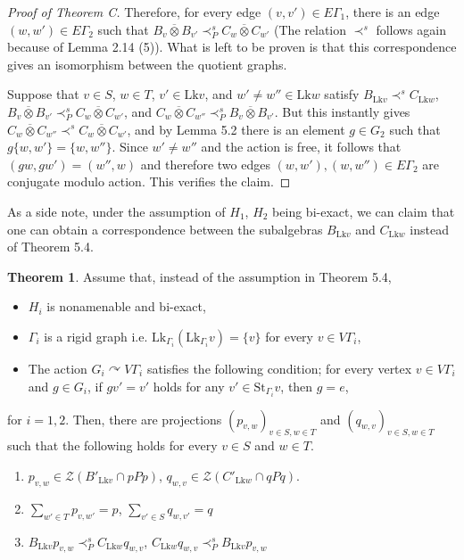\documentclass{amsart}
\theoremstyle{definition}
\newtheorem{theorem}{Theorem}[section]
\newcommand{\action}{\curvearrowright}
\begin{document}
\begin{proof}[Proof of Theorem C]
Therefore, for every edge $(v,v')\in E\Gamma_1$, 
there is an edge $(w,w')\in E\Gamma_2$ such that
$B_v\overline{\otimes} B_{v'} \prec^s_P C_w\overline{\otimes} C_{w'}$
(The relation $\prec^s$ follows again because of Lemma 2.14 (5)). 
What is left to be proven is that this correspondence gives an isomorphism between
the quotient graphs. 

Suppose that $v\in S$, $w\in T$, $v'\in \mathrm{Lk}v$, and $w'\neq w''\in \mathrm{Lk}w$
satisfy 
$B_{\mathrm{Lk}v}\prec^s C_{\mathrm{Lk}w}$, 
$B_v\overline{\otimes} B_{v'} \prec^s_P C_w\overline{\otimes} C_{w'}$, and
$C_w\overline{\otimes} C_{w''} \prec^s_P B_v\overline{\otimes} B_{v'}$. 
But this instantly gives 
$C_w\overline{\otimes} C_{w''}\prec^s C_w\overline{\otimes} C_{w'}$, 
and by Lemma 5.2 there is an element $g\in G_2$ such that 
$g\{ w, w' \} = \{w, w''\}$. 
Since $w'\neq w''$ and the action is free, 
it follows that $(gw,gw')=(w'', w)$ and therefore two edges $(w,w'), (w,w'')\in E\Gamma_2$ are conjugate modulo action. This verifies the claim. 
\end{proof}

As a side note, under the assumption of $H_1$, $H_2$ being bi-exact, 
we can claim that one can obtain a correspondence 
between the subalgebras $B_{\mathrm{Lk}v}$ and $C_{\mathrm{Lk}w}$
instead of Theorem 5.4. 


\begin{theorem}
Assume that, instead of the assumption in Theorem 5.4, 
\begin{itemize}
\item $H_i$ is nonamenable and bi-exact, 
\item $\Gamma_i$ is a rigid graph i.e. $\mathrm{Lk}_{\Gamma_i}(\mathrm{Lk}_{\Gamma_i}v)=\{ v \}$ for every $v\in V\Gamma_i$, 
\item The action $G_i\action V\Gamma_i$ satisfies the following condition;
for every vertex $v\in V\Gamma_i$ and $g\in G_i$, if $gv'=v'$ holds for any $v'\in \mathrm{St}_{\Gamma_i}v$, then $g=e$, 
\end{itemize}
for $i=1,2$. 
Then, there are projections
$(p_{v,w})_{v\in S, w\in T}$ and $(q_{w,v})_{v\in S, w\in T}$ such that
the following holds for every $v\in S$ and $w\in T$. 
\begin{enumerate}
\item $p_{v,w}\in \mathcal{Z}(B'_{\mathrm{Lk}v}\cap pPp)$, 
$q_{w,v}\in \mathcal{Z}(C'_{\mathrm{Lk}w}\cap qPq)$. \\
\item $\sum_{w'\in T} p_{v,w'}=p$, $\sum_{v'\in S} q_{w,v'}=q$  \\
\item $B_{\mathrm{Lk}v}p_{v,w} \prec^s_P C_{\mathrm{Lk}w}q_{w,v}$, 
$C_{\mathrm{Lk}w}q_{w,v} \prec^s_P B_{\mathrm{Lk}v}p_{v,w}$
\end{enumerate}
\end{theorem}
\end{document}
